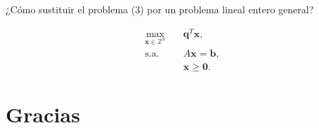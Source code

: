 \documentclass[aspectratio=169,professionalfonts]{beamer}
\newcommand{\Z}{\mathbb{Z}}
\renewcommand{\vec}[1]{\boldsymbol{#1}}
\begin{document}
\begin{frame}
	\begin{center}
		¿Cómo sustituir el problema (3) por un problema lineal entero general?
	\end{center}
	\begin{subequations}
		\begin{align}
			\max_{\vec{x} \in \Z^n} \quad
				& \vec{q}^T\vec{x}, \\
			\text{s.a.} \quad
					& A\vec{x} = \vec{b}, \\
					& \vec{x} \geq \vec{0}. \nonumber
		\end{align}
	\end{subequations}
\end{frame}


\section{Gracias}
\end{document}
